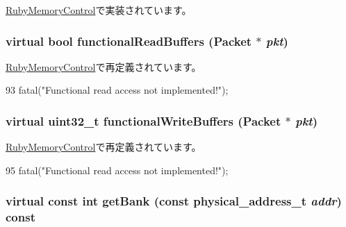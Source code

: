 \hyperlink{classRubyMemoryControl_aadad7bc8b989cfe93247844131735f70}{RubyMemoryControl}で実装されています。\hypertarget{classMemoryControl_ad587c16967cd8dc8b1dcb52a1ce0002b}{
\subsubsection[{functionalReadBuffers}]{\setlength{\rightskip}{0pt plus 5cm}virtual bool functionalReadBuffers ({\bf Packet} $\ast$ {\em pkt})}}
\label{classMemoryControl_ad587c16967cd8dc8b1dcb52a1ce0002b}


\hyperlink{classRubyMemoryControl_a898941f27bcf3a1c0383de5988406650}{RubyMemoryControl}で再定義されています。


\begin{DoxyCode}
93     { fatal("Functional read access not implemented!");}
\end{DoxyCode}
\hypertarget{classMemoryControl_aa1cf5fd9152389ffd0e21700945a149d}{
\subsubsection[{functionalWriteBuffers}]{\setlength{\rightskip}{0pt plus 5cm}virtual {\bf uint32\_\-t} functionalWriteBuffers ({\bf Packet} $\ast$ {\em pkt})}}
\label{classMemoryControl_aa1cf5fd9152389ffd0e21700945a149d}


\hyperlink{classRubyMemoryControl_a08f04f912fb872935cb2d40f8570c340}{RubyMemoryControl}で再定義されています。


\begin{DoxyCode}
95     { fatal("Functional read access not implemented!");}
\end{DoxyCode}
\hypertarget{classMemoryControl_a7a4691e15d68d8bf9df636adff2c964f}{
\subsubsection[{getBank}]{\setlength{\rightskip}{0pt plus 5cm}virtual const int getBank (const {\bf physical\_\-address\_\-t} {\em addr}) const}}
\label{classMemoryControl_a7a4691e15d68d8bf9df636adff2c964f}


